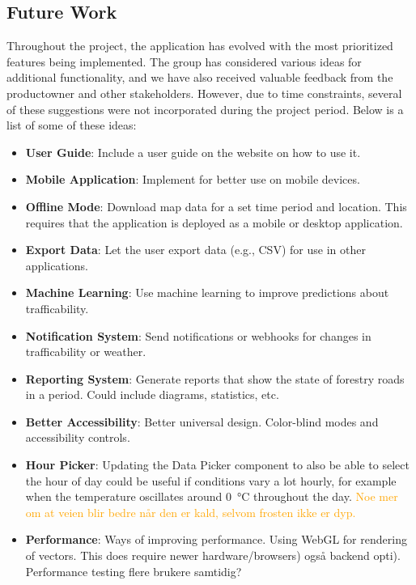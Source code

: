 \subsection{Future Work}

Throughout the project, the application has evolved with the most prioritized features being implemented. The group has considered various ideas for additional functionality, and we have also received valuable feedback from the \gls{productowner} and other stakeholders. However, due to time constraints, several of these suggestions were not incorporated during the project period. Below is a list of some of these ideas:

\begin{itemize}
    \item \textbf{User Guide}: Include a user guide on the website on how to use it.
    \item \textbf{Mobile Application}: Implement for better use on mobile devices.
    \item \textbf{Offline Mode}: Download map data for a set time period and location. This requires that the application is deployed as a mobile or desktop application.
    \item \textbf{Export Data}: Let the user export data (e.g., CSV) for use in other applications.
    \item \textbf{Machine Learning}: Use machine learning to improve predictions about trafficability.
    \item \textbf{Notification System}: Send notifications or webhooks for changes in trafficability or weather.
    \item \textbf{Reporting System}: Generate reports that show the state of forestry roads in a period. Could include diagrams, statistics, etc.
    \item \textbf{Better Accessibility}: Better universal design. Color-blind modes and accessibility controls.
    \item \textbf{Hour Picker}: Updating the Data Picker component to also be able to select the hour of day could be useful if conditions vary a lot hourly, for example when the temperature oscillates around \qty{0}{\celsius} throughout the day. \textcolor{orange}{Noe mer om at veien blir bedre når den er kald, selvom frosten ikke er dyp.}
    \item \textbf{Performance}: Ways of improving performance. Using WebGL for rendering of vectors. This does require newer hardware/browsers) også backend opti). Performance testing flere brukere samtidig?

\end{itemize}
